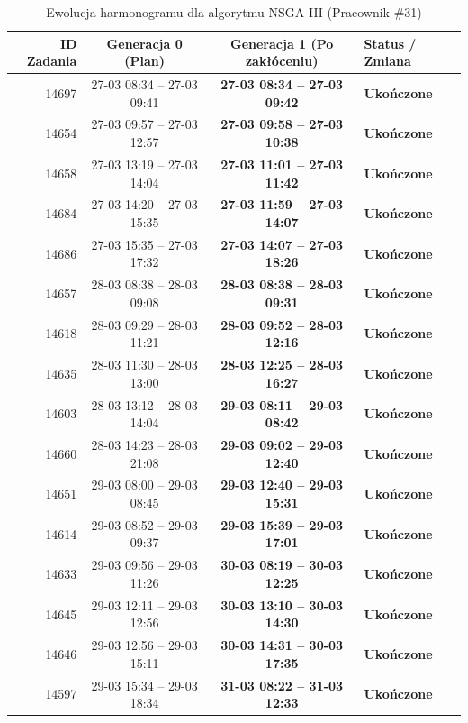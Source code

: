\begin{table}[htbp]
\centering\small
\caption{Ewolucja harmonogramu dla algorytmu NSGA-III (Pracownik \#31)}
\label{tab:case_study_nsgaiii_u31}
\begin{tabular}{|r|c|c|l|}
\hline
\textbf{ID Zadania} & \textbf{Generacja 0 (Plan)} & \textbf{Generacja 1 (Po zakłóceniu)} & \textbf{Status / Zmiana} \\ \hline
14697 & 27-03 08:34 -- 27-03 09:41 & \textbf{27-03 08:34 -- 27-03 09:42} & \textbf{Ukończone} \\ 
14654 & 27-03 09:57 -- 27-03 12:57 & \textbf{27-03 09:58 -- 27-03 10:38} & \textbf{Ukończone} \\ 
14658 & 27-03 13:19 -- 27-03 14:04 & \textbf{27-03 11:01 -- 27-03 11:42} & \textbf{Ukończone} \\ 
14684 & 27-03 14:20 -- 27-03 15:35 & \textbf{27-03 11:59 -- 27-03 14:07} & \textbf{Ukończone} \\ 
14686 & 27-03 15:35 -- 27-03 17:32 & \textbf{27-03 14:07 -- 27-03 18:26} & \textbf{Ukończone} \\ 
14657 & 28-03 08:38 -- 28-03 09:08 & \textbf{28-03 08:38 -- 28-03 09:31} & \textbf{Ukończone} \\ 
14618 & 28-03 09:29 -- 28-03 11:21 & \textbf{28-03 09:52 -- 28-03 12:16} & \textbf{Ukończone} \\ 
14635 & 28-03 11:30 -- 28-03 13:00 & \textbf{28-03 12:25 -- 28-03 16:27} & \textbf{Ukończone} \\ 
14603 & 28-03 13:12 -- 28-03 14:04 & \textbf{29-03 08:11 -- 29-03 08:42} & \textbf{Ukończone} \\ 
14660 & 28-03 14:23 -- 28-03 21:08 & \textbf{29-03 09:02 -- 29-03 12:40} & \textbf{Ukończone} \\ 
14651 & 29-03 08:00 -- 29-03 08:45 & \textbf{29-03 12:40 -- 29-03 15:31} & \textbf{Ukończone} \\ 
14614 & 29-03 08:52 -- 29-03 09:37 & \textbf{29-03 15:39 -- 29-03 17:01} & \textbf{Ukończone} \\ 
14633 & 29-03 09:56 -- 29-03 11:26 & \textbf{30-03 08:19 -- 30-03 12:25} & \textbf{Ukończone} \\ 
14645 & 29-03 12:11 -- 29-03 12:56 & \textbf{30-03 13:10 -- 30-03 14:30} & \textbf{Ukończone} \\ 
14646 & 29-03 12:56 -- 29-03 15:11 & \textbf{30-03 14:31 -- 30-03 17:35} & \textbf{Ukończone} \\ 
14597 & 29-03 15:34 -- 29-03 18:34 & \textbf{31-03 08:22 -- 31-03 12:33} & \textbf{Ukończone} \\ 

\end{tabular}
\end{table}
